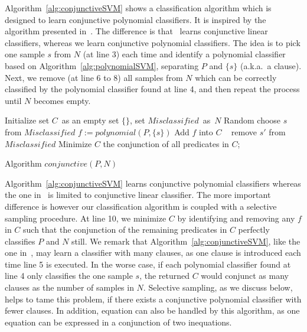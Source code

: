 Algorithm~\ref{alg:conjunctiveSVM} shows a classification algorithm which is designed to learn conjunctive polynomial classifiers.
It is inspired by the algorithm presented in~\cite{sharma2012interpolants}. 
The difference is that~\cite{sharma2012interpolants} learns conjunctive linear classifiers, whereas we learn conjunctive polynomial classifiers. 
The idea is to pick one sample $s$ from $N$ (at line 3) each time and identify a polynomial classifier based on Algorithm~\ref{alg:polynomialSVM},
 separating $P$ and $\{s\}$ (a.k.a.~a clause). 
Next, we remove (at line 6 to 8) all samples from $N$ which can be correctly classified by the polynomial classifier found at line 4, 
and then repeat the process until $N$ becomes empty.
\begin{algorithm}[t]
\SetAlgoVlined
\Indm
\Indp
    Initialize set $C$\ as an empty set $\{\}$, set $\mathit{Misclassified}$\ as\ $N$\;
     {
        Random choose $s$ from $\mathit{Misclassified}$\;
        $f := \mathit{polynomial}(P, \{s\})$\;
        Add $f$ into $C$\;
         {\
             {
                remove $s'$ from $\mathit{Misclassified}$\;
            }
        }
    }
    Minimize $C$\;
    \Return the conjunction of all predicates in $C$;
\caption{Algorithm $\mathit{conjunctive}(P, N)$}
\label{alg:conjunctiveSVM}
\end{algorithm}
Algorithm~\ref{alg:conjunctiveSVM} learns conjunctive polynomial classifiers whereas the one in~\cite{sharma2012interpolants} is limited to conjunctive linear classifier. 
The more important difference is however our classification algorithm is coupled with a selective sampling procedure.
At line 10, we minimize $C$ by identifying and removing any $f$ in $C$ such that the conjunction of the remaining predicates in $C$ perfectly classifies $P$ and $N$ still. 
We remark that Algorithm~\ref{alg:conjunctiveSVM}, like the one in~\cite{sharma2012interpolants}, 
may learn a classifier with many clauses, as one clause is introduced each time line 5 is executed. 
In the worse case, if each polynomial classifier found at line 4 only classifies the one sample $s$, the returned $C$ would conjunct as many clauses as the number of samples in $N$. 
Selective sampling, as we discuss below, helps to tame this problem, if there exists a conjunctive polynomial classifier with fewer clauses.
In addition, equation can also be handled by this algorithm, as one equation can be expressed in a conjunction of two inequations.
\vspace{-0.2cm}

